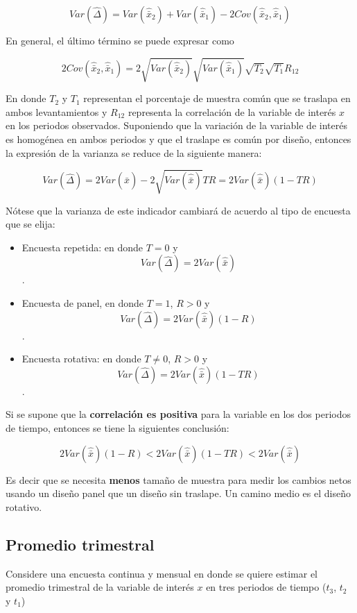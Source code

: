\[
Var(\hat{\Delta}) = Var(\hat{\bar{x}}_2) + Var(\hat{\bar{x}}_1) - 2Cov(\hat{\bar{x}}_2, \hat{\bar{x}}_1)
\]

En general, el último término se puede expresar como

\[
2Cov(\hat{\bar{x}}_2, \hat{\bar{x}}_1) = 
2\sqrt{Var(\hat{\bar{x}}_2)}\sqrt{Var(\hat{\bar{x}}_1)}\sqrt{T_2}\sqrt{T_1}R_{12}
\]

En donde \(T_2\) y \(T_1\) representan el porcentaje de muestra común que se traslapa en ambos levantamientos y \(R_{12}\) representa la correlación de la variable de interés \(x\) en los periodos observados. Suponiendo que la variación de la variable de interés es homogénea en ambos periodos y que el traslape es común por diseño, entonces la expresión de la varianza se reduce de la siguiente manera:

\[
Var(\hat{\Delta}) = 2Var(\hat{\bar{x}}) - 2\sqrt{Var(\hat{\bar{x}})}TR
=2Var(\hat{\bar{x}})(1-TR) 
\]

Nótese que la varianza de este indicador cambiará de acuerdo al tipo de encuesta que se elija:

\begin{itemize}
\tightlist
\item
  Encuesta repetida: en donde \(T=0\) y
  \[Var(\hat{\Delta}) = 2Var(\hat{\bar{x}})\].
\item
  Encuesta de panel, en donde \(T=1\), \(R > 0\) y
  \[Var(\hat{\Delta}) = 2Var(\hat{\bar{x}})(1-R)\].
\item
  Encuesta rotativa: en donde \(T\neq 0\), \(R > 0\) y
  \[Var(\hat{\Delta}) = 2Var(\hat{\bar{x}})(1-TR)\].
\end{itemize}

Si se supone que la \textbf{correlación es positiva} para la variable en los dos periodos de tiempo, entonces se tiene la siguientes conclusión:

\[
2Var(\hat{\bar{x}})(1-R) < 2Var(\hat{\bar{x}})(1-TR) < 2Var(\hat{\bar{x}})
\]

Es decir que se necesita \textbf{menos} tamaño de muestra para medir los cambios netos usando un diseño panel que un diseño sin traslape. Un camino medio es el diseño rotativo.

\hypertarget{promedio-trimestral}{%
\subsection*{Promedio trimestral}\label{promedio-trimestral}}


Considere una encuesta continua y mensual en donde se quiere estimar el promedio trimestral de la variable de interés \(x\) en tres periodos de tiempo (\(t_3\), \(t_2\) y \(t_1\))

